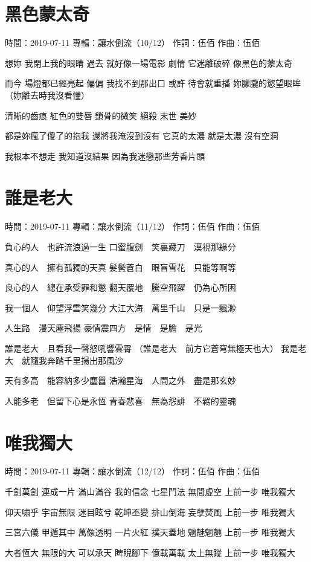 \documentclass[UTF8,a4paper,oneside,twocolumn,12pt]{ctexbook}
\newcommand{\infopair}[2]{\textbullet #1：#2}
\newcommand{\zc}[1][伍佰]{\infopair{作詞}{#1}}
\newcommand{\zq}[1][伍佰]{\infopair{作曲}{#1}}
\newcommand{\zj}[1]{\infopair{專輯}{#1}}
\newcommand{\sj}[1]{\infopair{時間}{#1}}
\newenvironment{info}{\begin{flushleft}\kaishu
	}
	{\end{flushleft}\normalsize\yahei\par}
\newenvironment{lyric}{
	}
{}
\begin{document}
\section{黑色蒙太奇}
\begin{info}
	\sj{2019-07-11}
	\zj{讓水倒流（10/12）}
	\zc
	\zq
\end{info}
\begin{lyric}
	想妳 我閉上我的眼睛
	過去 就好像一場電影
	劇情 它迷離破碎
	像黑色的蒙太奇

	而今 場燈都已經亮起
	偏偏 我找不到那出口
	或許 待會就重播
	妳朦朧的慾望眼眸
	（妳離去時我沒看懂）

	清晰的齒痕 紅色的雙唇 鎖骨的微笑
	絕殺 末世 美妙

	都是妳瘋了傻了的抱我
	還將我淹沒到沒有
	它真的太濃 就是太濃
	沒有空洞

	我根本不想走
	我知道沒結果
	因為我迷戀那些芳香片頭
\end{lyric}

\section{誰是老大}
\begin{info}
	\sj{2019-07-11}
	\zj{讓水倒流（11/12）}
	\zc
	\zq
\end{info}
\begin{lyric}
	負心的人　也許流浪過一生
	口蜜腹劍　笑裏藏刀　漠視那緣分

	真心的人　擁有孤獨的天真
	髮鬢蒼白　眼盲雪花　只能等啊等

	良心的人　總在承受罪和懲
	翻天覆地　騰空飛躍　仍為心所困

	我一個人　仰望浮雲笑幾分
	大江大海　萬里千山　只是一飄渺

	人生路　漫天塵飛揚
	豪情震四方　是情　是膽　是光

	誰是老大　且看我一聲怒吼響雲霄
	（誰是老大　前方它蒼穹無極天也大）
	我是老大　就隨我奔踏千里揚出那風沙

	天有多高　能容納多少塵囂
	浩瀚星海　人間之外　盡是那玄妙

	人能多老　但留下心是永恆
	青春悲喜　無為怨誹　不羈的靈魂
\end{lyric}

\section{唯我獨大}
\begin{info}
	\sj{2019-07-11}
	\zj{讓水倒流（12/12）}
	\zc
	\zq
\end{info}
\begin{lyric}
	千劍萬劍 連成一片
	滿山滿谷 我的信念
	七星鬥法 無間虛空
	上前一步 唯我獨大

	仰天嘯乎 宇宙無限
	迷目眩兮 乾坤丕變
	排山倒海 妄孽焚風
	上前一步 唯我獨大

	三宮六儀 甲遁其中
	萬像透明 一片火紅
	撲天蓋地 魑魅魍魎
	上前一步 唯我獨大

	大者恆大 無限的大
	可以承天 睥睨腳下
	億載萬載 太上無蹤
	上前一步 唯我獨大
\end{lyric}
\end{document}
